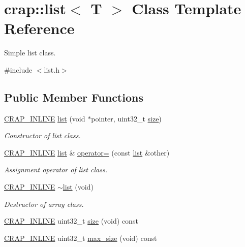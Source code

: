 \hypertarget{classcrap_1_1list}{\section{crap\+:\+:list$<$ T $>$ Class Template Reference}
\label{classcrap_1_1list}
}


Simple list class.  




{\ttfamily \#include $<$list.\+h$>$}

\subsection*{Public Member Functions}
\begin{DoxyCompactItemize}
\item 
\hyperlink{config__x86_8h_a5a40526b8d842e7ff731509998bb0f1c}{C\+R\+A\+P\+\_\+\+I\+N\+L\+I\+N\+E} \hyperlink{classcrap_1_1list_ae58fdb9473343db78b852d4f87507e75}{list} (void $\ast$pointer, uint32\+\_\+t \hyperlink{classcrap_1_1list_aacf0c986772d9bbd3de619f032c01c9a}{size})
\begin{DoxyCompactList}\small\item\em Constructor of list class. \end{DoxyCompactList}\item 
\hyperlink{config__x86_8h_a5a40526b8d842e7ff731509998bb0f1c}{C\+R\+A\+P\+\_\+\+I\+N\+L\+I\+N\+E} \hyperlink{classcrap_1_1list}{list} \& \hyperlink{classcrap_1_1list_ab90f49ea8c97e94bc42c9fc014bb22ae}{operator=} (const \hyperlink{classcrap_1_1list}{list} \&other)
\begin{DoxyCompactList}\small\item\em Assignment operator of list class. \end{DoxyCompactList}\item 
\hyperlink{config__x86_8h_a5a40526b8d842e7ff731509998bb0f1c}{C\+R\+A\+P\+\_\+\+I\+N\+L\+I\+N\+E} \hyperlink{classcrap_1_1list_aa6b4215fb357b3567d4e0f78d2381139}{$\sim$list} (void)
\begin{DoxyCompactList}\small\item\em Destructor of array class. \end{DoxyCompactList}\item 
\hyperlink{config__x86_8h_a5a40526b8d842e7ff731509998bb0f1c}{C\+R\+A\+P\+\_\+\+I\+N\+L\+I\+N\+E} uint32\+\_\+t \hyperlink{classcrap_1_1list_aacf0c986772d9bbd3de619f032c01c9a}{size} (void) const 
\item 
\hyperlink{config__x86_8h_a5a40526b8d842e7ff731509998bb0f1c}{C\+R\+A\+P\+\_\+\+I\+N\+L\+I\+N\+E} uint32\+\_\+t \hyperlink{classcrap_1_1list_aa35f01bd506a4aadc5e9bad18892a73c}{max\+\_\+size} (void) const 

\end{DoxyCompactItemize}
